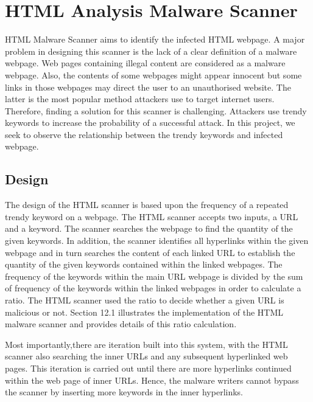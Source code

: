 \section{HTML Analysis Malware Scanner}

HTML Malware Scanner aims to identify the infected HTML webpage. A major problem in designing this scanner is the lack of a clear definition of a malware webpage. Web pages containing illegal content are considered as a malware webpage. Also, the contents of some webpages might appear innocent but some links in those webpages may direct the user to an unauthorised website. The latter is the most popular method attackers use to target internet users. Therefore, finding a solution for this scanner is challenging. Attackers use trendy keywords to increase the probability of a successful attack. In this project, we seek to observe the relationship between the trendy keywords and infected webpage.

\subsection{Design}

The design of the HTML scanner is based upon the frequency of a repeated trendy keyword on a webpage. The HTML scanner accepts two inputs, a URL and a keyword. The scanner searches the webpage to find the quantity of the given keywords. In addition, the scanner identifies all hyperlinks within the given webpage and in turn searches the content of each linked URL to establish the quantity of the given keywords contained within the linked webpages. The frequency of the keywords within the main URL webpage is divided by the sum of frequency of the keywords within the linked webpages in order to calculate a ratio. The HTML scanner used the ratio to decide whether a given URL is malicious or not. Section 12.1 illustrates the implementation of the HTML malware scanner and provides details of this ratio calculation.

Most importantly,there are iteration built into this system, with the HTML scanner also searching the inner URLs and any subsequent hyperlinked web pages. This iteration is carried out until there are more hyperlinks continued within the web page of inner URLs. Hence, the malware writers cannot bypass the scanner by inserting more keywords in the inner hyperlinks. 
